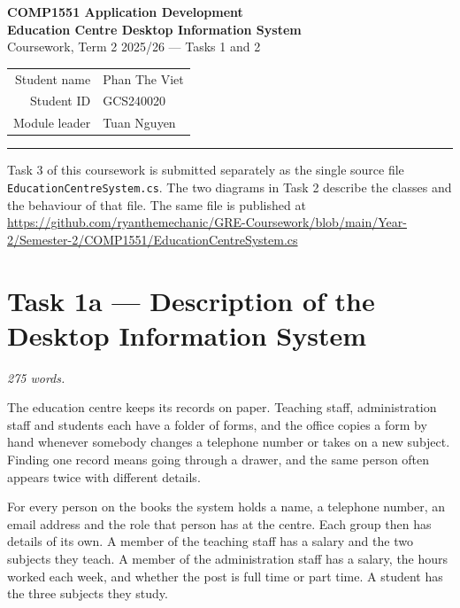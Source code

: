 \documentclass[11pt,a4paper]{article}
\begin{document}
\begin{center}
  {\large\textbf{COMP1551 Application Development}}\\[0.35em]
  {\Large\textbf{Education Centre Desktop Information System}}\\[0.6em]
  {\normalsize Coursework, Term 2 2025/26 --- Tasks 1 and 2}\\[1.0em]
  \begin{tabular}{rl}
    Student name & Phan The Viet\\
    Student ID   & GCS240020\\
    Module leader & Tuan Nguyen\\
  \end{tabular}
\end{center}

\vspace{0.4em}
\hrule
\vspace{0.8em}

Task 3 of this coursework is submitted separately as the single source file
\texttt{EducationCentre\allowbreak System.cs}. The two diagrams in Task 2
describe the classes and the behaviour of that file. The same file is published
at\\
{\small\url{https://github.com/ryanthemechanic/GRE-Coursework/blob/main/Year-2/Semester-2/COMP1551/EducationCentreSystem.cs}}

\section*{Task 1a --- Description of the Desktop Information System}

\textit{275 words.}

The education centre keeps its records on paper. Teaching staff, administration
staff and students each have a folder of forms, and the office copies a form by
hand whenever somebody changes a telephone number or takes on a new subject.
Finding one record means going through a drawer, and the same person often
appears twice with different details.

For every person on the books the system holds a name, a telephone number, an
email address and the role that person has at the centre. Each group then has
details of its own. A member of the teaching staff has a salary and the two
subjects they teach. A member of the administration staff has a salary, the
hours worked each week, and whether the post is full time or part time. A
student has the three subjects they study.
\end{document}
